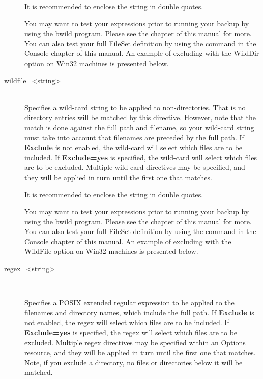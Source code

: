 \begin{description}
   It is recommended to enclose the string in double quotes.

   You may want to test your expressions prior to running your
   backup by using the bwild program. Please see the
    chapter of this manual for
   more. You can also test your full FileSet definition by using
   the  command in the Console
   chapter of this manual.
   An example of excluding with the WildDir option on Win32 machines is
   presented below.

\item [wildfile={\textless}string{\textgreater}] \hfill \\
   Specifies a wild-card string to be applied to non-directories. That
   is no directory entries will be matched by this directive.
   However, note that the match is done against the full path and filename,
   so your wild-card string must take into account that filenames
   are preceded by the full path.
   If {\bf Exclude}
   is not enabled, the wild-card will select which files are to be
   included.  If {\bf Exclude=yes} is specified, the wild-card will select
   which files are to be excluded.  Multiple wild-card directives may be
   specified, and they will be applied in turn until the first one that
   matches.

   It is recommended to enclose the string in double quotes.

   You may want to test your expressions prior to running your
   backup by using the bwild program. Please see the
    chapter of this manual for
   more. You can also test your full FileSet definition by using
   the  command in the Console
   chapter of this manual.
   An example of excluding with the WildFile option on Win32 machines is
   presented below.


\item [regex={\textless}string{\textgreater}] \hfill \\

\label{FileRegex}

   Specifies a POSIX extended regular expression to be applied to the
   filenames and directory names, which include the full path.  If {\bf
   Exclude} is not enabled, the regex will select which files are to be
   included.  If {\bf Exclude=yes} is specified, the regex will select
   which files are to be excluded.  Multiple regex directives may be
   specified within an Options resource, and they will be applied in turn
   until the first one that matches.  Note, if you exclude a directory, no
   files or directories below it will be matched.


\end{description}
